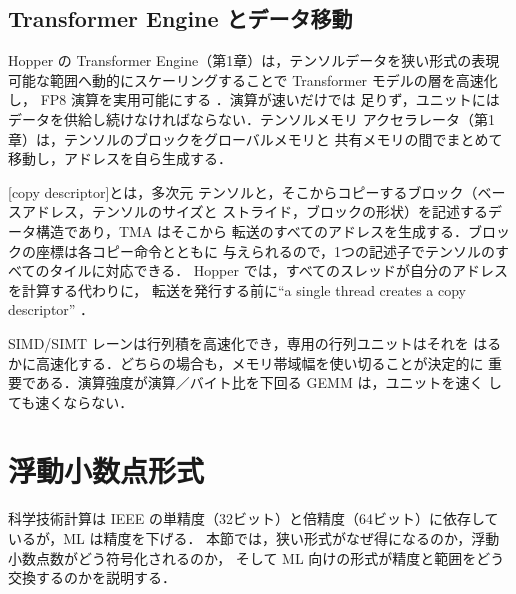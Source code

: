 \documentclass[../main.tex]{subfiles}
\begin{document}
\subsection{Transformer Engine とデータ移動}
\label{sec:l12-te}

Hopper の Transformer Engine（第1章）は，テンソルデータを狭い形式の表現
可能な範囲へ動的にスケーリングすることで Transformer モデルの層を高速化し，
FP8 演算を実用可能にする \cite{nvidia2022hopper}．演算が速いだけでは
足りず，ユニットにはデータを供給し続けなければならない．テンソルメモリ
アクセラレータ（第1章）は，テンソルのブロックをグローバルメモリと
共有メモリの間でまとめて移動し，アドレスを自ら生成する．

\begin{definition}[コピー記述子]
  [copy descriptor]とは，多次元
  テンソルと，そこからコピーするブロック（ベースアドレス，テンソルのサイズと
  ストライド，ブロックの形状）を記述するデータ構造であり，TMA はそこから
  転送のすべてのアドレスを生成する．ブロックの座標は各コピー命令とともに
  与えられるので，1つの記述子でテンソルのすべてのタイルに対応できる．
  Hopper では，すべてのスレッドが自分のアドレスを計算する代わりに，
  転送を発行する前に\enquote{a single thread creates a copy descriptor}
  \cite{nvidia2022hopper}．
\end{definition}

\begin{keypoint}
  SIMD/SIMT レーンは行列積を高速化でき，専用の行列ユニットはそれを
  はるかに高速化する．どちらの場合も，メモリ帯域幅を使い切ることが決定的に
  重要である．演算強度が演算／バイト比を下回る GEMM は，ユニットを速く
  しても速くならない．
\end{keypoint}

\section{浮動小数点形式}
\label{sec:l12-formats}

科学技術計算は IEEE の単精度（32ビット）と倍精度（64ビット）に依存して
いるが，ML は精度を下げる．
本節では，狭い形式がなぜ得になるのか，浮動小数点数がどう符号化されるのか，
そして ML 向けの形式が精度と範囲をどう交換するのかを説明する．
\end{document}
